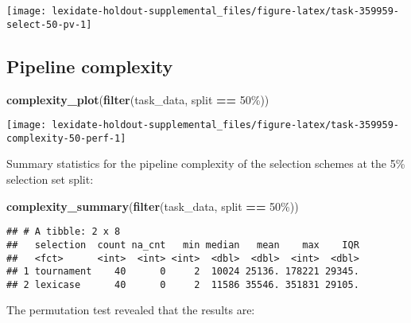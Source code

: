 \documentclass[
]{book}
\newenvironment{Shaded}{\begin{snugshade}}{\end{snugshade}}
\newcommand{\FunctionTok}[1]{\textcolor[rgb]{0.13,0.29,0.53}{\textbf{#1}}}
\newcommand{\NormalTok}[1]{#1}
\newcommand{\SpecialCharTok}[1]{\textcolor[rgb]{0.81,0.36,0.00}{\textbf{#1}}}
\newcommand{\StringTok}[1]{\textcolor[rgb]{0.31,0.60,0.02}{#1}}
\begin{document}
\texttt{[image: lexidate-holdout-supplemental\_files/figure-latex/task-359959-select-50-pv-1]}

\hypertarget{pipeline-complexity-35}{%
\subsection{Pipeline complexity}\label{pipeline-complexity-35}}

\begin{Shaded}
\begin{Highlighting}[]
\FunctionTok{complexity\_plot}\NormalTok{(}\FunctionTok{filter}\NormalTok{(task\_data, split }\SpecialCharTok{==} \StringTok{\textquotesingle{}50\%\textquotesingle{}}\NormalTok{))}
\end{Highlighting}
\end{Shaded}

\texttt{[image: lexidate-holdout-supplemental\_files/figure-latex/task-359959-complexity-50-perf-1]}

Summary statistics for the pipeline complexity of the selection schemes at the 5\% selection set split:

\begin{Shaded}
\begin{Highlighting}[]
\FunctionTok{complexity\_summary}\NormalTok{(}\FunctionTok{filter}\NormalTok{(task\_data, split }\SpecialCharTok{==} \StringTok{\textquotesingle{}50\%\textquotesingle{}}\NormalTok{))}
\end{Highlighting}
\end{Shaded}

\begin{verbatim}
## # A tibble: 2 x 8
##   selection  count na_cnt   min median   mean    max    IQR
##   <fct>      <int>  <int> <int>  <dbl>  <dbl>  <int>  <dbl>
## 1 tournament    40      0     2  10024 25136. 178221 29345.
## 2 lexicase      40      0     2  11586 35546. 351831 29105.
\end{verbatim}

The permutation test revealed that the results are:
\end{document}
